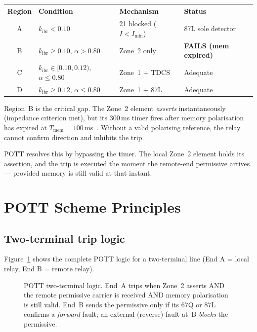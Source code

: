 \documentclass[11pt,a4paper]{article}
\begin{document}
\begin{center}
\begin{tabular}{@{}clll@{}}
\toprule
Region & Condition & Mechanism & Status\\
\midrule
A & $k_\mathrm{ibr}<0.10$ & 21 blocked ($I<I_\mathrm{min}$) & 87L sole detector\\
B & $k_\mathrm{ibr}\geq0.10$, $\alpha>0.80$ & Zone~2 only & \textbf{FAILS (mem expired)}\\
C & $k_\mathrm{ibr}\in[0.10,0.12)$, $\alpha\leq0.80$ & Zone~1 + TDCS & Adequate\\
D & $k_\mathrm{ibr}\geq0.12$, $\alpha\leq0.80$ & Zone~1 + 87L & Adequate\\
\bottomrule
\end{tabular}
\end{center}

\medskip\noindent
Region~B is the critical gap.  The Zone~2 element \emph{asserts} instantaneously
(impedance criterion met), but its 300\,ms timer fires after memory polarisation
has expired at $T_\mathrm{mem}=100$\,ms~\cite{SAMBP_TR30}.  Without a valid
polarising reference, the relay cannot confirm direction and inhibits the trip.

POTT resolves this by bypassing the timer.  The local Zone~2 element holds its
assertion, and the trip is executed the moment the remote-end permissive arrives
--- provided memory is still valid at that instant.

\section{POTT Scheme Principles}
\label{sec:principles}

\subsection{Two-terminal trip logic}

Figure~\ref{fig:logic} shows the complete POTT logic for a two-terminal line
(End A = local relay, End B = remote relay).

\begin{figure}[htbp]
  \centering
  \resizebox{0.92\textwidth}{!}{%
  }
  \caption{POTT two-terminal logic.  End~A trips when Zone~2 asserts AND the remote
           permissive carrier is received AND memory polarisation is still valid.
           End~B sends the permissive only if its 67Q or 87L confirms a
           \emph{forward} fault; an external (reverse) fault at~B \emph{blocks}
           the permissive.}
  \label{fig:logic}
\end{figure}
\end{document}
